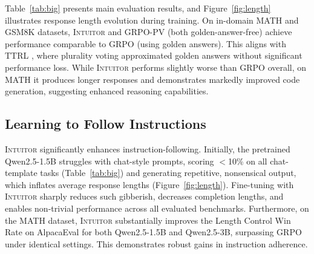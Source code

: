 \documentclass{article} %
\newcommand{\methodname}{\textsc{Intuitor}\xspace}
\begin{document}
Table~\ref{tab:big} presents main evaluation results, and Figure~\ref{fig:length} illustrates response length evolution during training. On in-domain MATH and GSM8K datasets, \methodname and GRPO-PV (both golden-answer-free) achieve performance comparable to GRPO (using golden answers). This aligns with TTRL \citep{zuo2025ttrl}, where plurality voting approximated golden answers without significant performance loss. While \methodname performs slightly worse than GRPO overall, on MATH it produces longer responses and demonstrates markedly improved code generation, suggesting enhanced reasoning capabilities.

\subsection{Learning to Follow Instructions}

\methodname significantly enhances instruction-following. Initially, the pretrained Qwen2.5-1.5B struggles with chat-style prompts, scoring $<$10\% on all chat-template tasks (Table~\ref{tab:big}) and generating repetitive, nonsensical output, which inflates average response lengths (Figure~\ref{fig:length}). Fine-tuning with \methodname sharply reduces such gibberish, decreases completion lengths, and enables non-trivial performance across all evaluated benchmarks. Furthermore, on the MATH dataset, \methodname substantially improves the Length Control Win Rate on AlpacaEval for both Qwen2.5-1.5B and Qwen2.5-3B, surpassing GRPO under identical settings. This demonstrates robust gains in instruction adherence.
\end{document}
